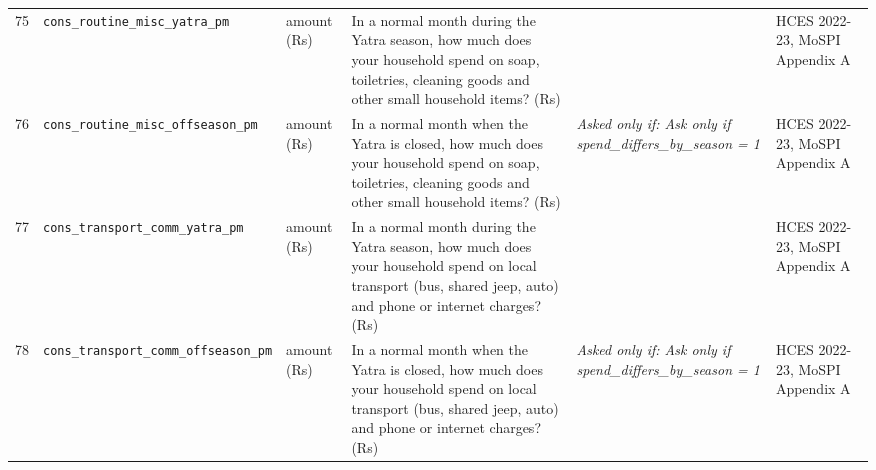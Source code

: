 \documentclass[9pt,a4paper,landscape]{article}
\begin{document}
\begin{longtable}{@{}p{0.5cm}p{3.3cm}p{1.7cm}p{7.3cm}p{5.6cm}p{5.4cm}@{}}
\footnotesize 75 & \footnotesize\texttt{cons\_routine\_misc\_yatra\_pm} & \scriptsize amount (Rs) & \footnotesize In a normal month during the Yatra season, how much does your household spend on soap, toiletries, cleaning goods and other small household items? (Rs)\par\vspace{1pt}{\footnotesize\color{hdr}{\hifont यात्रा के मौसम के आम महीने में, आप (और जो यहाँ आपके साथ रहते हैं) साबुन, नहाने-धोने का सामान, सफ़ाई का सामान और घर की दूसरी छोटी चीज़ों पर कितना ख़र्च करते हैं? (रुपये)}} & \scriptsize  & \scriptsize HCES 2022-23, MoSPI Appendix A\\
\footnotesize 76 & \footnotesize\texttt{cons\_routine\_misc\_offseason\_pm} & \scriptsize amount (Rs) & \footnotesize In a normal month when the Yatra is closed, how much does your household spend on soap, toiletries, cleaning goods and other small household items? (Rs)\par\vspace{1pt}{\footnotesize\color{hdr}{\hifont जब यात्रा बंद रहती है, उस आम महीने में आपका घर साबुन, नहाने-धोने का सामान, सफ़ाई का सामान और घर की दूसरी छोटी चीज़ों पर कितना ख़र्च करता है? (रुपये)}} & \scriptsize \textit{Asked only if: Ask only if spend\_differs\_by\_season = 1} & \scriptsize HCES 2022-23, MoSPI Appendix A\\
\footnotesize 77 & \footnotesize\texttt{cons\_transport\_comm\_yatra\_pm} & \scriptsize amount (Rs) & \footnotesize In a normal month during the Yatra season, how much does your household spend on local transport (bus, shared jeep, auto) and phone or internet charges? (Rs)\par\vspace{1pt}{\footnotesize\color{hdr}{\hifont यात्रा के मौसम के आम महीने में, आप (और जो यहाँ आपके साथ रहते हैं) आने-जाने (बस, जीप, ऑटो) और फ़ोन या इंटरनेट पर कितना ख़र्च करते हैं? (रुपये)}} & \scriptsize  & \scriptsize HCES 2022-23, MoSPI Appendix A\\
\footnotesize 78 & \footnotesize\texttt{cons\_transport\_comm\_offseason\_pm} & \scriptsize amount (Rs) & \footnotesize In a normal month when the Yatra is closed, how much does your household spend on local transport (bus, shared jeep, auto) and phone or internet charges? (Rs)\par\vspace{1pt}{\footnotesize\color{hdr}{\hifont जब यात्रा बंद रहती है, उस आम महीने में आपका घर आने-जाने (बस, जीप, ऑटो) और फ़ोन या इंटरनेट पर कितना ख़र्च करता है? (रुपये)}} & \scriptsize \textit{Asked only if: Ask only if spend\_differs\_by\_season = 1} & \scriptsize HCES 2022-23, MoSPI Appendix A\\

\end{longtable}
\end{document}
